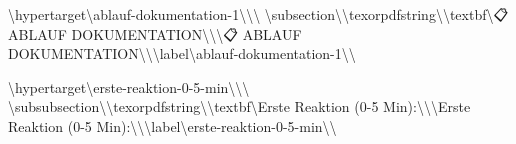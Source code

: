 \textbackslash{}hypertarget\textbackslash{}{ablauf-dokumentation-1\textbackslash{}}\textbackslash{}{\textbackslash{}%
\textbackslash{}subsection\textbackslash{}{\textbackslash{}texorpdfstring\textbackslash{}{\textbackslash{}textbf\textbackslash{}{📋 ABLAUF DOKUMENTATION\textbackslash{}}\textbackslash{}}\textbackslash{}{📋 ABLAUF DOKUMENTATION\textbackslash{}}\textbackslash{}}\textbackslash{}label\textbackslash{}{ablauf-dokumentation-1\textbackslash{}}\textbackslash{}}

\textbackslash{}hypertarget\textbackslash{}{erste-reaktion-0-5-min\textbackslash{}}\textbackslash{}{\textbackslash{}%
\textbackslash{}subsubsection\textbackslash{}{\textbackslash{}texorpdfstring\textbackslash{}{\textbackslash{}textbf\textbackslash{}{Erste Reaktion (0-5 Min):\textbackslash{}}\textbackslash{}}\textbackslash{}{Erste Reaktion (0-5 Min):\textbackslash{}}\textbackslash{}}\textbackslash{}label\textbackslash{}{erste-reaktion-0-5-min\textbackslash{}}\textbackslash{}}

